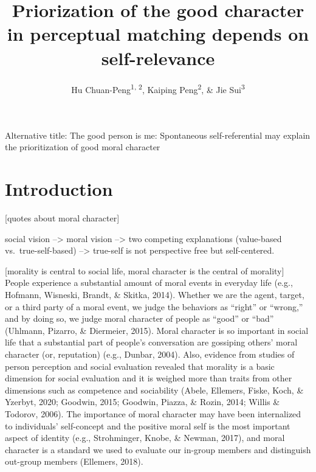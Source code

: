 \documentclass[
  english,
  man]{apa6}
\title{Priorization of the good character in perceptual matching depends on self-relevance}
\author{Hu Chuan-Peng\textsuperscript{1, 2}, Kaiping Peng\textsuperscript{2}, \& Jie Sui\textsuperscript{3}}
\date{}
\affiliation{\vspace{0.5cm}\textsuperscript{1} Nanjing Normal University, 210024 Nanjing, China\\\textsuperscript{2} Tsinghua University, 100084 Beijing, China\\\textsuperscript{3} University of Aberdeen, Aberdeen, Scotland}
\begin{document}
\maketitle

Alternative title: The good person is me: Spontaneous self-referential may explain the prioritization of good moral character

\hypertarget{introduction}{%
\section{Introduction}\label{introduction}}

{[}quotes about moral character{]}

social vision --\textgreater{} moral vision --\textgreater{} two competing explanations (value-based vs.~true-self-based) --\textgreater{} true-self is not perspective free but self-centered.

{[}morality is central to social life, moral character is the central of morality{]}
People experience a substantial amount of moral events in everyday life (e.g., Hofmann, Wisneski, Brandt, \& Skitka, 2014). Whether we are the agent, target, or a third party of a moral event, we judge the behaviors as ``right'' or ``wrong,'' and by doing so, we judge moral character of people as ``good'' or ``bad'' (Uhlmann, Pizarro, \& Diermeier, 2015). Moral character is so important in social life that a substantial part of people's conversation are gossiping others' moral character (or, reputation) (e.g., Dunbar, 2004). Also, evidence from studies of person perception and social evaluation revealed that morality is a basic dimension for social evaluation and it is weighed more than traits from other dimensions such as competence and sociability (Abele, Ellemers, Fiske, Koch, \& Yzerbyt, 2020; Goodwin, 2015; Goodwin, Piazza, \& Rozin, 2014; Willis \& Todorov, 2006). The importance of moral character may have been internalized to individuals' self-concept and the positive moral self is the most important aspect of identity (e.g., Strohminger, Knobe, \& Newman, 2017), and moral character is a standard we used to evaluate our in-group members and distinguish out-group members (Ellemers, 2018).
\end{document}
